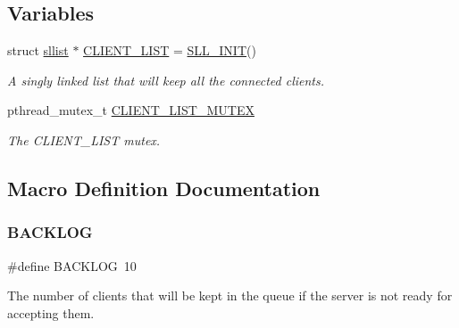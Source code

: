 \subsection*{Variables}
\begin{DoxyCompactItemize}
\item 
struct \hyperlink{structsllist}{sllist} $\ast$ \hyperlink{zip-zop-server_8c_a32076dcdfaf1057a014d74d01cc7e08e}{C\+L\+I\+E\+N\+T\+\_\+\+L\+I\+ST} = \hyperlink{sllist_8h_a4f1348bb9eb6fe8c2b112e39c1887290}{S\+L\+L\+\_\+\+I\+N\+IT}()
\begin{DoxyCompactList}\small\item\em A singly linked list that will keep all the connected clients. \end{DoxyCompactList}\item 
pthread\+\_\+mutex\+\_\+t \hyperlink{zip-zop-server_8c_ac58873310e66c9bfafdbc798a8a7c7e2}{C\+L\+I\+E\+N\+T\+\_\+\+L\+I\+S\+T\+\_\+\+M\+U\+T\+EX}
\begin{DoxyCompactList}\small\item\em The {\ttfamily C\+L\+I\+E\+N\+T\+\_\+\+L\+I\+ST} mutex. \end{DoxyCompactList}\end{DoxyCompactItemize}


\subsection{Macro Definition Documentation}
\mbox{\label{zip-zop-server_8c_aeefbbafa97642defe3ee6c3080b7d66f}} 
\subsubsection{\texorpdfstring{B\+A\+C\+K\+L\+OG}{BACKLOG}}
{\footnotesize\ttfamily \#define B\+A\+C\+K\+L\+OG~10}



The number of clients that will be kept in the queue if the server is not ready for accepting them. 

\mbox{\label{zip-zop-server_8c_a2966c973ff2fbc59d762420ad283e82f}} 
